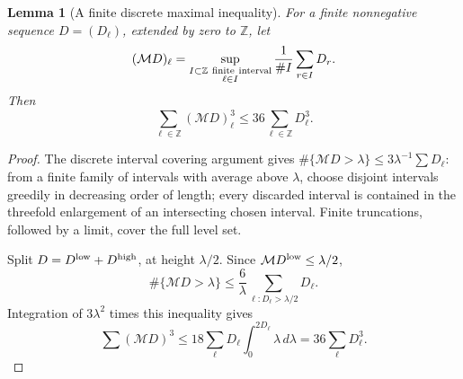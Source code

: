 \documentclass[11pt]{article}
\numberwithin{equation}{section}
\newtheorem{lemma}[theorem]{Lemma}
\theoremstyle{remark}
\newcommand{\Z}{\mathbb Z}
\begin{document}
\begin{lemma}[A finite discrete maximal inequality]\label{lem:discrete}
For a finite nonnegative sequence \(D=(D_\ell)\), extended by zero to
\(\Z\), let
\[
 (\mathcal MD)_\ell=
 \sup_{\substack{I\subset\Z\ {\rm finite\ interval}\\\ell\in I}}
        \frac1{\# I}\sum_{r\in I}D_r.
\]
Then
\begin{equation}
 \sum_{\ell\in\Z}(\mathcal MD)_\ell^3
       \le36\sum_{\ell\in\Z}D_\ell^3 .
 \label{eq:maximal}
\end{equation}
\end{lemma}
\begin{proof}
The discrete interval covering argument gives
\(\#\{\mathcal MD>\lambda\}\le3\lambda^{-1}\sum D_\ell\):
from a finite family of intervals with average above \(\lambda\), choose
disjoint intervals greedily in decreasing order of length; every
discarded interval is contained in the threefold enlargement of an
intersecting chosen interval. Finite truncations, followed by a limit,
cover the full level set.

Split \(D=D^{\rm low}+D^{\rm high}\), at height \(\lambda/2\).
Since \(\mathcal MD^{\rm low}\le\lambda/2\),
\[
 \#\{\mathcal MD>\lambda\}
 \le\frac6\lambda\sum_{\ell:D_\ell>\lambda/2}D_\ell.
\]
Integration of \(3\lambda^2\) times this inequality gives
\[
 \sum(\mathcal MD)^3
 \le18\sum_\ell D_\ell\int_0^{2D_\ell}\lambda\,d\lambda
 =36\sum_\ell D_\ell^3.
\]
\end{proof}
\end{document}
